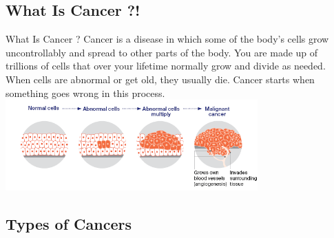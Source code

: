 \documentclass{beamer}
\begin{document}
    \subsection{What Is Cancer ?!}
    \begin{frame}{What Is Cancer ?} 
      \centering
      Cancer is a disease in which some of the body’s cells grow uncontrollably and spread to other parts of the body. 
      You are made up of trillions of cells that over your lifetime normally grow and divide as needed. When cells are abnormal or get old, they usually die. Cancer starts when something goes wrong in this process.
          \includegraphics[height=3.5cm]{resources/How_cancer_starts}
    \end{frame}
    \subsection{Types of Cancers}
\end{document}
